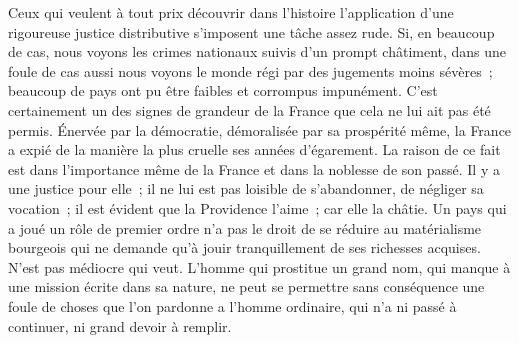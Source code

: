\documentclass[french,twoside]{book} %
\begin{document}
\noindent Ceux qui veulent à tout prix découvrir dans l’histoire l’application d’une rigoureuse justice distributive s’imposent une tâche assez rude. Si, en beaucoup de cas, nous voyons les crimes nationaux suivis d’un prompt châtiment, dans une foule de cas aussi nous voyons le monde régi par des jugements moins sévères ; beaucoup de pays ont pu être faibles et corrompus impunément. C’est certainement un des signes de grandeur de la France que cela ne lui ait pas été permis. Énervée par la démocratie, démoralisée par sa prospérité même, la France a expié de la manière la plus cruelle ses années d’égarement. La raison de ce fait est dans l’importance même de la France et dans la noblesse de son passé. Il y a une justice pour elle ; il ne lui est pas loisible de s’abandonner, de négliger sa vocation ; il est évident que la Providence l’aime ; car elle la châtie. Un pays qui a joué un rôle de premier ordre n’a pas le droit de se réduire au matérialisme bourgeois qui ne demande qu’à jouir tranquillement de ses richesses acquises. N’est pas médiocre qui veut. L’homme qui prostitue un grand nom, qui manque à une mission écrite dans sa nature, ne peut se permettre sans conséquence une foule de choses que l’on pardonne a l’homme ordinaire, qui n’a ni passé à continuer, ni grand devoir à remplir.\par
\end{document}
